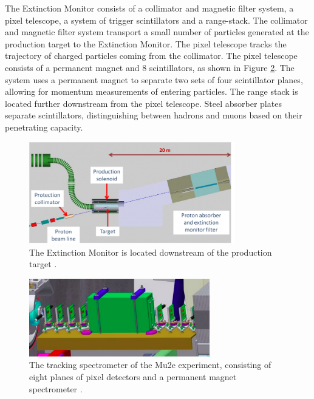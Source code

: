 The Extinction Monitor consists of a collimator and magnetic filter 
system, a pixel telescope, a system of trigger scintillators and a range-stack. The collimator and 
magnetic filter system transport a small number of 
particles generated at the production target to the Extinction Monitor. The pixel telescope 
tracks the trajectory of charged particles coming from 
the collimator. The pixel telescope consists of a permanent magnet and 8 scintillators, as shown 
in Figure \ref{fig:extintionmonitor}. The system uses a 
permanent magnet to separate two sets of four scintillator planes, allowing for momentum measurements 
of entering particles. The range stack is located further 
downstream from the pixel telescope. Steel absorber plates separate scintillators, distinguishing 
between hadrons and muons based on their penetrating capacity.
\begin{figure}[!h]
\centering
\includegraphics[width =0.8\textwidth]{figures/png/800px-Extinction_filter.png}
\caption[The Extintion Monitor location.]{The Extinction Monitor is located downstream of the
production target \cite{Prebys:IPAC2015-THPF121}.}
\label{fig:extintion}
\end{figure}
\begin{figure}[!h]
\centering
\includegraphics[width =0.7\textwidth]{figures/png/Screenshot_20240306_184720.png}
\caption[The Extintion Monitor.]{The tracking spectrometer of the Mu2e experiment, consisting of eight planes of pixel detectors and a permanent magnet spectrometer \cite{Prebys:IPAC2015-THPF121}.}
\label{fig:extintionmonitor}
\end{figure}
